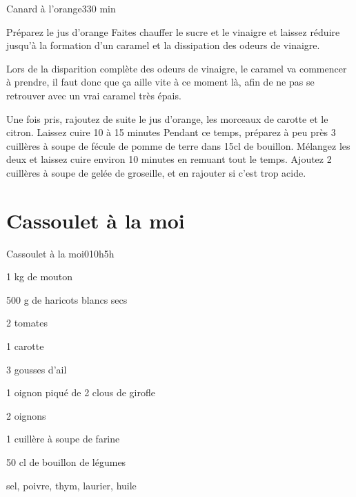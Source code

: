 {\begin{recette}{Canard à l'orange}{3}{30 min}{}
\begin{preparation}
\etape Préparez le jus d'orange
\etape Faites chauffer le sucre et le vinaigre et laissez réduire jusqu'à la formation d'un caramel et la dissipation des odeurs 
de vinaigre.
\begin{attention}
Lors de la disparition complète des odeurs de vinaigre, le caramel va commencer à prendre, il faut donc que ça aille vite à ce 
moment là, afin de ne pas se retrouver avec un vrai caramel très épais. 
\end{attention}

\etape Une fois pris, rajoutez de suite le jus d'orange, les morceaux de carotte et le citron. Laissez cuire 10 à 15 minutes
\etape Pendant ce temps, préparez à peu près 3 cuillères à soupe de fécule de pomme de terre dans 15cl de bouillon.
\etape Mélangez les deux et laissez cuire environ 10 minutes en remuant tout le temps. 
\etape Ajoutez 2 cuillères à soupe de gelée de groseille, et en rajouter si c'est trop acide.
\end{preparation}
\end{recette}

\section{Cassoulet à la moi}
\begin{recette}{Cassoulet à la moi}{0}{10h}{5h}
\begin{ingredients}[7 pers.]
\item 1 kg de mouton
\item 500 g de haricots blancs secs
\item 2 tomates
\item 1 carotte
\item 3 gousses d'ail
\item 1 oignon piqué de 2 clous de girofle
\item 2 oignons
\item 1 cuillère à soupe de farine
\item 50 cl de bouillon de légumes
\item sel, poivre, thym, laurier, huile
\end{ingredients}


\end{recette}}
